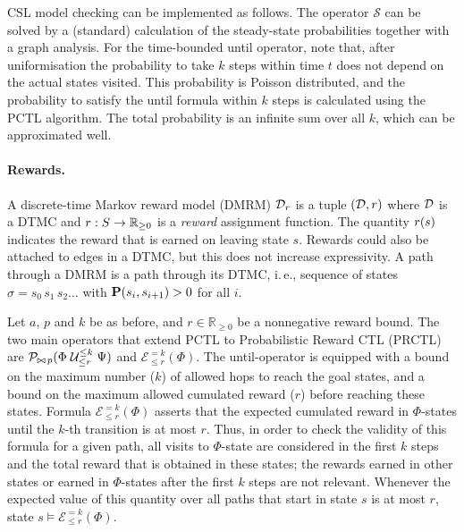 \documentclass{llncs}
\begin{document}
        CSL model checking \cite{AzizSSB_ACMTCL00,BaierHHK_TSE03} can be implemented as follows.
        The operator $\mathcal{S}$ can be solved by a (standard) calculation of the steady-state 
        probabilities together with a graph analysis.
        For the time-bounded until operator, note that,
        after uniformisation the probability to take $k$ steps within time $t$
        does not depend on the actual states visited.
        This probability is Poisson distributed,
        and the probability to satisfy the until formula within $k$ steps
        is calculated using the PCTL algorithm.
        The total probability is an infinite sum over all $k$, which can be approximated well.

\paragraph{Rewards.}
A discrete-time Markov reward model (DMRM) $\mathcal{D}_r$ is a tuple $(\mathcal{D}, r)$ where 
$\mathcal{D}$ is a DTMC and $r: S \to \mathbb{R}_{\geq 0}$ is a \emph{reward} assignment
function.
The quantity $r(s)$ indicates the reward that is earned on leaving state $s$.
Rewards could also be attached to edges in a DTMC, but this does not
increase expressivity.
A path through a DMRM is a path through its DTMC, i.\,e., sequence of states $\sigma = 
s_0 \, s_1 \, s_2 \ldots$ with $\mathbf{P}(s_i,s_{i{+}1}) > 0$ for all $i$.

        Let $a$, $p$ and $k$ be as before,
        and $r \in \mathbb{R}_{\geq 0}$ be a nonnegative reward bound.
        The two main operators that extend PCTL to Probabilistic Reward CTL (PRCTL) \cite{AndovaHK_FORMATS03} 
        are $\mathcal{P}_{\bowtie \, p}(\Phi \mathrel{\mathrel{\mathcal{U}}^{\leq k}_{\leq r}} \Psi)$ and
          $\mathcal{E}^{{=}k}_{\leq r}(\Phi)$.
        The until-operator is equipped with a bound
        on the maximum number ($k$) of allowed hops to reach the goal states,
        and a bound on the maximum allowed cumulated reward ($r$)
        before reaching these states.
Formula $\mathcal{E}^{{=}k}_{\leq r}(\Phi)$ asserts that the expected cumulated 
reward in $\Phi$-states until the $k$-th transition is at most $r$.
Thus, in order to check the validity of this formula for a given path, all visits to
$\Phi$-state are considered in the first $k$ steps and the total reward that is 
obtained in these states;
        the rewards earned in other states
        or earned in $\Phi$-states after the first $k$ steps
        are not relevant.
Whenever the expected value of this quantity over all paths that start in state 
$s$ is at most $r$, state $s \models \mathcal{E}^{{=}k}_{\leq r}(\Phi)$.
\end{document}
